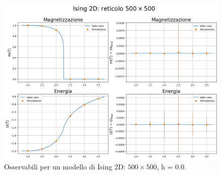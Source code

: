 \vspace*{\fill}



\vspace*{\fill}

\begin{figure}[htpb]
    \centering
    \includegraphics[page=1, width=\textwidth]{Immagini/simIsing2D/obs/obs_500.png}
    \caption{Osservabili per un modello di Ising 2D: $500 \times 500$, h = 0.0.}
\end{figure}

\vspace*{\fill}